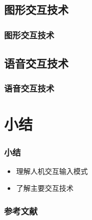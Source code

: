 \documentclass{beamer}
\newcommand{\fullPageImage}[2]{
	{
		\usebackgroundtemplate{\texttt{[image: \#1]}}
		\frame[plain]{#2}
	}
}
\begin{document}

\subsection{图形交互技术}
\begin{frame}
	\frametitle{图形交互技术}

\end{frame}

\subsection{语音交互技术}
\begin{frame}
	\frametitle{语音交互技术}

\end{frame}

%

\section{小结}
\begin{frame}
	\frametitle{小结}
	\begin{itemize}
		\item 理解人机交互输入模式
		\item 了解主要交互技术
	\end{itemize}
\end{frame}
 
\begin{frame}
	\frametitle{参考文献}
	
	
\end{frame}
\end{document}
